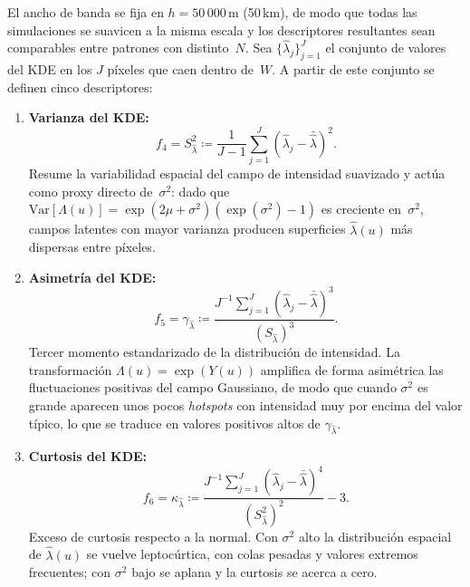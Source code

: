 \documentclass[a4paper,fleqn]{cas-sc}
\numberwithin{equation}{section}
\begin{document}
El ancho de banda se fija en $h=50\,000$\,m (50\,km), de modo que todas las simulaciones se suavicen a la misma escala y los descriptores resultantes sean comparables entre patrones con distinto~$N$. Sea
$\{\hat{\lambda}_j\}_{j=1}^{J}$ el conjunto de valores del KDE en los $J$
p\'ixeles que caen dentro de~$W$. A partir de este conjunto se definen
cinco descriptores:
\begin{enumerate}[label=(\roman*),leftmargin=*,itemsep=0.6em]
\item \textbf{Varianza del KDE:}
\begin{equation}
f_4 = S_{\hat{\lambda}}^2 \coloneqq
    \frac{1}{J-1}\sum_{j=1}^{J}(\hat{\lambda}_j - \bar{\hat{\lambda}})^2.
\label{eq:f4_var_kde}
\end{equation}
Resume la variabilidad espacial del campo de intensidad suavizado y act\'ua como proxy directo de~$\sigma^2$: dado que
$\mathrm{Var}[\Lambda(u)]=\exp(2\mu+\sigma^2)(\exp(\sigma^2)-1)$ es
creciente en~$\sigma^2$, campos latentes con mayor varianza producen
superficies $\hat{\lambda}(u)$ m\'as dispersas entre p\'ixeles.

\item \textbf{Asimetr\'ia del KDE:}
\begin{equation}
f_5 = \gamma_{\hat{\lambda}} \coloneqq
    \frac{J^{-1}\sum_{j=1}^{J}(\hat{\lambda}_j -
    \bar{\hat{\lambda}})^3}{(S_{\hat{\lambda}})^3}.
\label{eq:f5_skew}
\end{equation}
Tercer momento estandarizado de la distribuci\'on de intensidad. La
transformaci\'on $\Lambda(u)=\exp(Y(u))$ amplifica de forma asim\'etrica
las fluctuaciones positivas del campo Gaussiano, de modo que cuando
$\sigma^2$ es grande aparecen unos pocos \emph{hotspots} con intensidad
muy por encima del valor t\'ipico, lo que se traduce en valores positivos
altos de $\gamma_{\hat{\lambda}}$.

\item \textbf{Curtosis del KDE:}
\begin{equation}
f_6 = \kappa_{\hat{\lambda}} \coloneqq
    \frac{J^{-1}\sum_{j=1}^{J}(\hat{\lambda}_j -
    \bar{\hat{\lambda}})^4}{(S_{\hat{\lambda}}^2)^2} - 3.
\label{eq:f6_kurt}
\end{equation}
Exceso de curtosis respecto a la normal. Con $\sigma^2$ alto la distribuci\'on espacial de $\hat{\lambda}(u)$ se vuelve leptoc\'urtica, con colas pesadas y valores extremos frecuentes; con $\sigma^2$ bajo se aplana y la curtosis se acerca a cero.


\end{enumerate}
\end{document}
